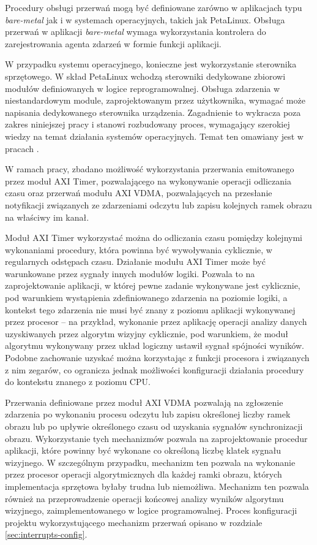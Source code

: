 Procedury obsługi przerwań mogą być definiowane zarówno w aplikacjach typu \textit{bare-metal} jak i w systemach operacyjnych, takich jak PetaLinux.
Obsługa przerwań w aplikacji \textit{bare-metal} wymaga wykorzystania kontrolera do zarejestrowania agenta zdarzeń w formie funkcji aplikacji.

W przypadku systemu operacyjnego, konieczne jest wykorzystanie sterownika sprzętowego. 
W skład PetaLinux wchodzą sterowniki dedykowane zbiorowi modułów definiowanych w logice reprogramowalnej. 
Obsługa zdarzenia w niestandardowym module, zaprojektowanym przez użytkownika, wymagać może napisania dedykowanego sterownika urządzenia.
Zagadnienie to wykracza poza zakres niniejszej pracy i stanowi rozbudowany proces, wymagający szerokiej wiedzy na temat działania systemów operacyjnych. 
Temat ten omawiany jest w pracach \cite{Love2014,Corbet2005}.

W ramach pracy, zbadano możliwość wykorzystania przerwania emitowanego przez moduł AXI Timer, pozwalającego na wykonywanie operacji odliczania czasu oraz przerwań modułu AXI VDMA, pozwalających na przesłanie notyfikacji związanych ze zdarzeniami odczytu lub zapisu kolejnych ramek obrazu na właściwy im kanał.

Moduł AXI Timer wykorzystać można do odliczania czasu pomiędzy kolejnymi wykonaniami procedury, która powinna być wywoływania cyklicznie, w regularnych odstępach czasu. 
Działanie modułu AXI Timer może być warunkowane przez sygnały innych modułów logiki. 
Pozwala to na zaprojektowanie aplikacji, w której pewne zadanie wykonywane jest cyklicznie, pod warunkiem wystąpienia zdefiniowanego zdarzenia na poziomie logiki, a kontekst tego zdarzenia nie musi być znany z poziomu aplikacji wykonywanej przez procesor -- na przykład, wykonanie przez aplikację operacji analizy danych uzyskiwanych przez algorytm wizyjny cyklicznie, pod warunkiem, że moduł algorytmu wykonywany przez układ logiczny ustawił sygnał spójności wyników.
Podobne zachowanie uzyskać można korzystając z funkcji procesora i związanych z nim zegarów, co ogranicza jednak możliwości konfiguracji działania procedury do kontekstu znanego z poziomu CPU.


Przerwania definiowane przez moduł AXI VDMA pozwalają na zgłoszenie zdarzenia po wykonaniu procesu odczytu lub zapisu określonej liczby ramek obrazu lub po upływie określonego czasu od uzyskania sygnałów synchronizacji obrazu. 
Wykorzystanie tych mechanizmów pozwala na zaprojektowanie procedur aplikacji, które powinny być wykonane co określoną liczbę klatek sygnału wizyjnego. 
W szczególnym przypadku, mechanizm ten pozwala na wykonanie przez procesor operacji algorytmicznych dla każdej ramki obrazu, których implementacja sprzętowa byłaby trudna lub niemożliwa. 
Mechanizm ten pozwala również na przeprowadzenie operacji końcowej analizy wyników algorytmu wizyjnego, zaimplementowanego w logice programowalnej. 
Proces konfiguracji projektu wykorzystującego mechanizm przerwań opisano w rozdziale \ref{sec:interrupts-config}.